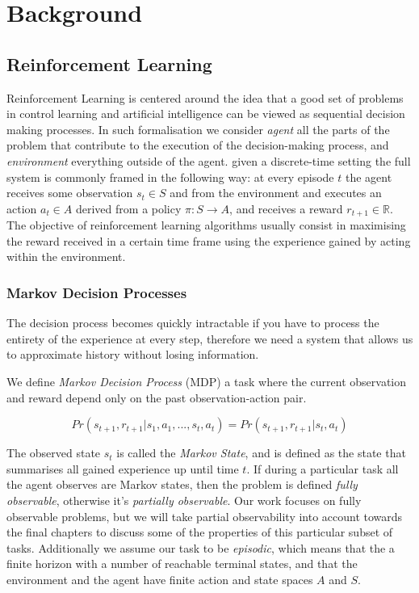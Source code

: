 

\chapter{Background}

\section{Reinforcement Learning}

Reinforcement Learning is centered around the idea that a good set of problems
in control learning and artificial intelligence can be viewed as sequential
decision making processes. In such formalisation we consider \emph{agent} all
the parts of the problem that contribute to the execution of the decision-making
process, and \emph{environment} everything outside of the agent. given a
discrete-time setting the full system is commonly framed in the following way:
at every episode $t$ the agent receives some observation $s_t \in S$ and from the
environment and executes an action $a_t \in A$ derived from a policy $\pi : S
\rightarrow A$, and receives a reward $r_{t+1} \in \mathbb{R}$. The objective of
reinforcement learning algorithms usually consist in maximising the reward
received in a certain time frame using the experience gained by acting within
the environment. 

\subsection{Markov Decision Processes}

The decision process becomes quickly intractable if you have to process the
entirety of the experience at every step, therefore we need a system that allows
us to approximate history without losing information.

We define \emph{Markov Decision Process} (MDP) a task where the current
observation and reward depend only on the past observation-action pair.

\begin{equation}
Pr(s_{t+1}, r_{t+1} | s_1, a_1, ... , s_t, a_t) = Pr(s_{t+1}, r_{t+1} |
s_t, a_t)
\end{equation}

The observed state $s_t$ is called the \emph{Markov State}, and is defined as
the state that summarises all gained experience up until time $t$. If during a
particular task all the agent observes are Markov states, then the problem is
defined \emph{fully observable}, otherwise it's \emph{partially observable}. Our
work focuses on fully observable problems, but we will take partial
observability into account towards the final chapters to discuss some of the
properties of this particular subset of tasks. Additionally we assume our task
to be \emph{episodic}, which means that the a finite horizon with a number of
reachable terminal states, and that the environment and the agent have finite 
action and state spaces $A$ and $S$.

